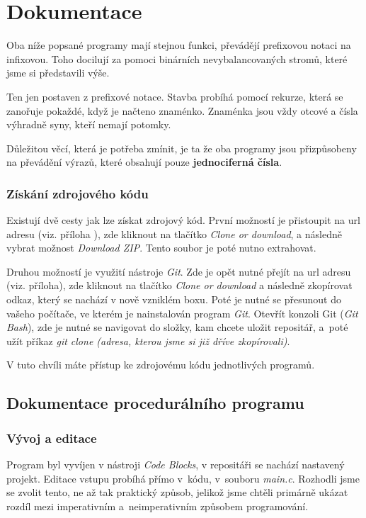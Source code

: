 \documentclass[12pt,a4paper]{report}
\begin{document}
\chapter{Dokumentace}
Oba níže popsané programy mají stejnou funkci, převádějí prefixovou notaci na infixovou. Toho docilují za pomoci binárních nevybalancovaných stromů, které jsme si představili výše.

Ten jen postaven z prefixové notace. Stavba probíhá pomocí rekurze, která se zanořuje pokaždé, když je načteno znaménko. Znaménka jsou vždy otcové a čísla výhradně syny, kteří nemají potomky.

Důležitou věcí, která je potřeba zmínit, je ta že oba programy jsou přizpůsobeny na převádění výrazů, které obsahují pouze \textbf{jednociferná čísla}. 

\subsection*{Získání zdrojového kódu}
Existují dvě cesty jak lze získat zdrojový kód. První možností je přistoupit na url adresu (viz. příloha ), zde kliknout na tlačítko \textit{Clone or download}, a následně vybrat možnost \textit{Download ZIP}. Tento soubor je poté nutno extrahovat. 

Druhou možností je využití nástroje \textit{Git}. Zde je opět nutné přejít na url adresu (viz. příloha), zde kliknout na tlačítko \textit{Clone or download} a následně zkopírovat odkaz, který se nachází v nově vzniklém boxu. Poté je nutné se přesunout do vašeho počítače, ve kterém je nainstalován program \textit{Git}. Otevřít konzoli Git (\textit{Git Bash}), zde je nutné se navigovat do složky, kam chcete uložit repositář, a~poté užít příkaz \textit{git clone (adresa, kterou jsme si již dříve zkopírovali)}.

V tuto chvíli máte přístup ke zdrojovému kódu jednotlivých programů.   

\section{Dokumentace procedurálního programu}

\subsection{Vývoj a editace}
Program byl vyvíjen v nástroji \textit{Code Blocks}, v repositáři se nachází nastavený projekt. Editace vstupu probíhá přímo v~kódu, v~souboru \textit{main.c}. Rozhodli jsme se zvolit tento, ne až tak praktický způsob, jelikož jsme chtěli primárně ukázat rozdíl mezi imperativním a~neimperativním způsobem programování. 
\newpage
\end{document}
